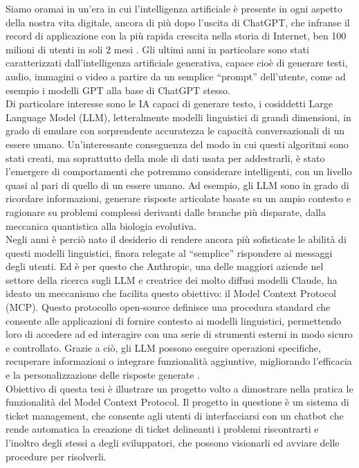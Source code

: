 ﻿Siamo oramai in un'era in cui l'intelligenza artificiale è presente in ogni aspetto della nostra vita digitale, ancora di più dopo l'uscita di ChatGPT, che infranse il record di applicazione con la più rapida crescita nella storia di Internet, ben 100 milioni di utenti in soli 2 mesi \cite{ubs2023latest}. Gli ultimi anni in particolare sono stati caratterizzati dall’intelligenza artificiale generativa, capace cioè di generare testi, audio, immagini o video a partire da un semplice “prompt” dell’utente, come ad esempio i modelli GPT alla base di ChatGPT stesso. \\
Di particolare interesse sono le IA capaci di generare testo, i cosiddetti Large Language Model (LLM), letteralmente modelli linguistici di grandi dimensioni, in grado di emulare con sorprendente accuratezza le capacità conversazionali di un essere umano. Un'interessante conseguenza del modo in cui questi algoritmi sono stati creati, ma soprattutto della mole di dati usata per addestrarli, è stato l’emergere di comportamenti che potremmo considerare intelligenti, con un livello quasi al pari di quello di un essere umano. Ad esempio, gli LLM sono in grado di ricordare informazioni, generare risposte articolate basate su un ampio contesto e ragionare su problemi complessi derivanti dalle branche più disparate, dalla meccanica quantistica alla biologia evolutiva. \\
Negli anni è perciò nato il desiderio di rendere ancora più sofisticate le abilità di questi modelli linguistici, finora relegate al “semplice” rispondere ai messaggi degli utenti. Ed è per questo che Anthropic, una delle maggiori aziende nel settore della ricerca sugli LLM e creatrice dei molto diffusi modelli Claude, ha ideato un meccanismo che facilita questo obiettivo: il Model Context Protocol (MCP). Questo protocollo open-source definisce una procedura standard che consente alle applicazioni di fornire contesto ai modelli linguistici, permettendo loro di accedere ad ed interagire con una serie di strumenti esterni in modo sicuro e controllato. Grazie a ciò, gli LLM possono eseguire operazioni specifiche, recuperare informazioni o integrare funzionalità aggiuntive, migliorando l’efficacia e la personalizzazione delle risposte generate \cite{modelcontextprotocol2023}. \\
Obiettivo di questa tesi è illustrare un progetto volto a dimostrare nella pratica le funzionalità del Model Context Protocol. Il progetto in questione è un sistema di ticket management, che consente agli utenti di interfacciarsi con un chatbot che rende automatica la creazione di ticket delineanti i problemi riscontrarti e l'inoltro degli stessi a degli sviluppatori, che possono visionarli ed avviare delle procedure per risolverli.
